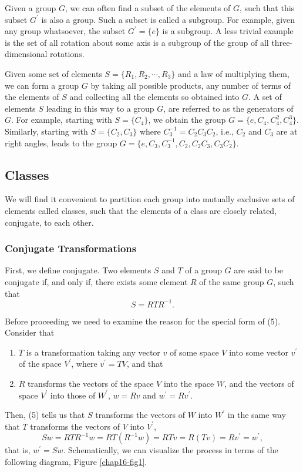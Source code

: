 Given a group $G$, we can often find a subset of the elements of $G$, 
such that this subset $G^{\prime}$ is also a group.  Such a subset is 
called a subgroup.  For example, given any group whatsoever, the 
subset $G^{\prime}=\{e\}$ is a subgroup.  A less trivial example is 
the set of all rotation about some axis is a subgroup of the group of 
all three-dimensional rotations.

Given some set of elements $S = \{R_1,R_2,\cdots ,R_3\}$ and a law of 
multiplying them, we can form a group $G$ by taking all possible 
products, any number of terms of the elements of $S$ and collecting all 
the elements so obtained into $G$.  A set of elements $S$ leading in 
this way to a group $G$, are referred to as the generators of $G$.  
For example, starting with $S = \{C_4\}$, we obtain the group $G = 
\{e,C_4,C^2_4,C^3_4\}$.  Similarly, starting with $S = \{C_2,C_3\}$ 
where $C_3^{-1}=C_2C_3C_2$, i.e., $C_2$ and $C_3$ are at right 
angles, leads to the group $G = \{e,C_3,C_3^{-1},C_2,C_2C_3, C_3C_2\}$.

\subsection{Classes}

We will find it convenient to partition each group into mutually 
exclusive sets of elements called classes, such that the elements of 
a class are closely related, conjugate, to each other.

\subsubsection{Conjugate Transformations}

First, we define conjugate.  Two elements $S$ and $T$ of a group $G$ 
are said to be conjugate if, and only if, there exists some element 
$R$ of the same group $G$, such that
\begin{equation}
S = RTR^{-1}.
\label{chap16-eqno5}
\end{equation}

Before proceeding we need to examine the reason for the special form 
of (5). Consider that
\begin{enumerate}
\item $T$ is a transformation taking any vector $v$ of some 
space $V$ into some vector $v^{\prime}$ of the space $V^{\prime}$, 
where $v^{\prime} = TV$, and that
\item $R$ transforms the vectors of the space $V$ into the 
space $W$, and the vectors of space $V^{\prime}$ into those of 
$W^{\prime}$, $w = Rv$ and $w^{\prime}=Rv^{\prime}$.  
\end{enumerate}
Then, (5) tells us that $S$ transforms the vectors of $W$ into 
$W^{\prime}$ in the same way that $T$ transforms the vectors of $V$ 
into $V^{\prime}$,
\begin{equation}
Sw=RTR^{-1}w=RT(R^{-1}w)=RTv=R(Tv)=Rv^{\prime}=w^{\prime},
\end{equation}
that is, $w^{\prime}=Sw$.  Schematically, we can visualize the process
in terms of the following diagram, Figure \ref{chap16-fig1}.


